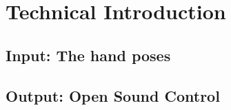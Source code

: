
\chapter{Technical Introduction}
\label{ch:techintro}

\section{Input: The hand poses}

\section{Output: Open Sound Control}
